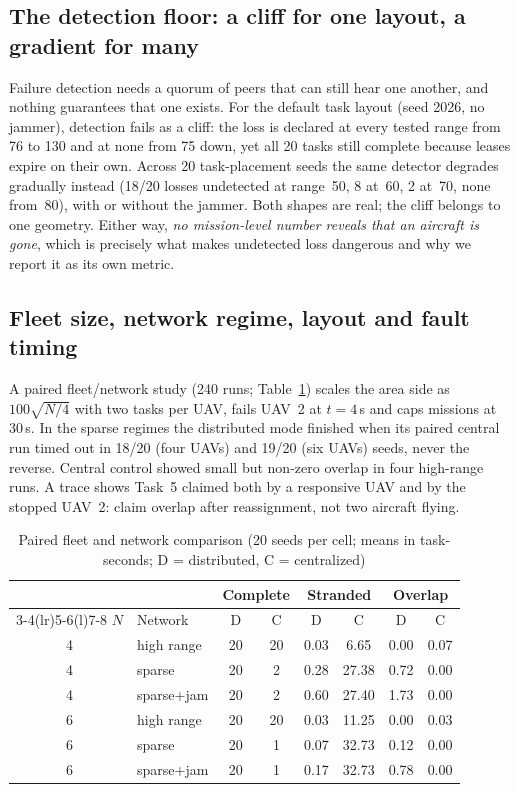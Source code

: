 \documentclass[conference]{IEEEtran}
\begin{document}
\subsection{The detection floor: a cliff for one layout, a gradient for many}
\label{sec:detect}

Failure detection needs a quorum of peers that can still hear one another,
and nothing guarantees that one exists. For the default task layout (seed
2026, no jammer), detection fails as a cliff: the loss is declared at every
tested range from 76 to 130 and at none from 75 down, yet all 20 tasks still
complete because leases expire on their own. Across 20 task-placement seeds the same detector
degrades gradually instead (18/20 losses undetected at range~50, 8 at~60, 2
at~70, none from~80), with or without the jammer. Both shapes are real; the
cliff belongs to one geometry. Either way, \emph{no mission-level number
reveals that an aircraft is gone}, which is precisely what makes undetected
loss dangerous and why we report it as its own metric.

\subsection{Fleet size, network regime, layout and fault timing}
\label{sec:generality}

A paired fleet/network study (240 runs; Table~\ref{tab:gen}) scales the area
side as $100\sqrt{N/4}$ with two tasks per UAV, fails UAV~2 at $t=4$\,s and
caps missions at 30\,s. In the sparse regimes the distributed mode finished
when its paired central run timed out in 18/20 (four UAVs) and 19/20 (six
UAVs) seeds, never the reverse. Central control showed small but non-zero
overlap in four high-range runs. A trace shows Task~5 claimed both by a
responsive UAV and by the stopped UAV~2: claim overlap after reassignment,
not two aircraft flying.

\begin{table}[t]
\caption{Paired fleet and network comparison (20 seeds per cell; means in
task-seconds; D = distributed, C = centralized)}
\label{tab:gen}
\centering
\footnotesize
\setlength{\tabcolsep}{3.2pt}
\begin{tabular}{@{}clcccccc@{}}
\toprule
& & \multicolumn{2}{c}{Complete} & \multicolumn{2}{c}{Stranded} & \multicolumn{2}{c}{Overlap} \\
\cmidrule(lr){3-4}\cmidrule(lr){5-6}\cmidrule(l){7-8}
$N$ & Network & D & C & D & C & D & C \\
\midrule
4 & high range & 20 & 20 & 0.03 & 6.65  & 0.00 & 0.07 \\
4 & sparse     & 20 & 2  & 0.28 & 27.38 & 0.72 & 0.00 \\
4 & sparse+jam & 20 & 2  & 0.60 & 27.40 & 1.73 & 0.00 \\
6 & high range & 20 & 20 & 0.03 & 11.25 & 0.00 & 0.03 \\
6 & sparse     & 20 & 1  & 0.07 & 32.73 & 0.12 & 0.00 \\
6 & sparse+jam & 20 & 1  & 0.17 & 32.73 & 0.78 & 0.00 \\
\bottomrule
\end{tabular}
\end{table}
\end{document}

